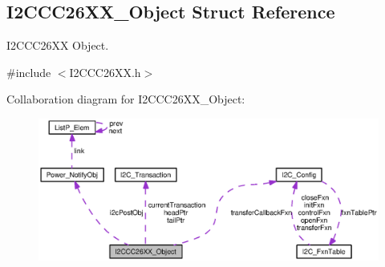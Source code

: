 \subsection{I2\+C\+C\+C26\+X\+X\+\_\+\+Object Struct Reference}
\label{struct_i2_c_c_c26_x_x___object}


I2\+C\+C\+C26\+X\+X Object.  




{\ttfamily \#include $<$I2\+C\+C\+C26\+X\+X.\+h$>$}



Collaboration diagram for I2\+C\+C\+C26\+X\+X\+\_\+\+Object\+:
\nopagebreak
\begin{figure}[H]
\begin{center}
\leavevmode
\includegraphics[width=350pt]{struct_i2_c_c_c26_x_x___object__coll__graph}
\end{center}
\end{figure}
